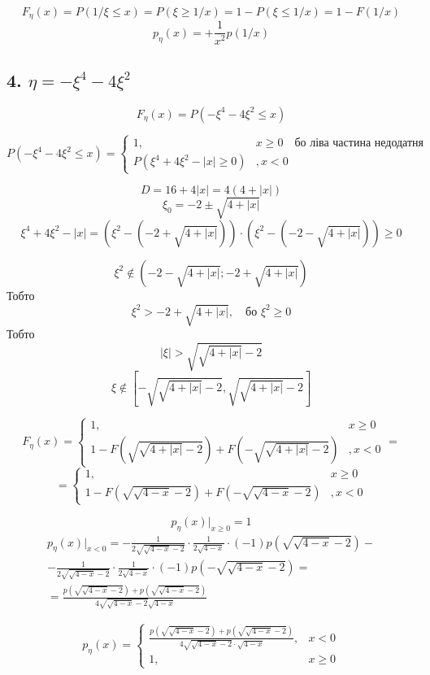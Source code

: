 \documentclass[11pt, a4paper]{article} %
\begin{document}
$$F_\eta(x) = P(1/\xi \le x) = P(\xi \ge 1/x) = 1 - P(\xi \le 1/x) = 1-F(1/x)$$
$$p_\eta(x) = +\frac{1}{x^2} p(1/x)$$

\subsection*{4. $\eta =-\xi^4-4\xi^2$}

$$F_\eta(x) = P(-\xi^4-4\xi^2 \le x)$$

$$P(-\xi^4 - 4\xi^2 \le x) = \begin{cases}
    1,& x\ge0 \quad \text{бо ліва частина недодатня}\\
    P(\xi^4 + 4\xi^2 - |x| \ge 0)&, x<0
\end{cases}$$

$$D = 16 + 4|x| = 4(4+|x|)$$
$$\xi_0 = -2 \pm \sqrt{4+|x|}$$
$$\xi^4 + 4\xi^2 - |x| = (\xi^2 - (-2 + \sqrt{4+|x|}))\cdot (\xi^2 - (-2 - \sqrt{4+|x|})) \ge 0$$

$$\xi^2 \notin (-2 - \sqrt{4+|x|}; -2 + \sqrt{4+|x|})$$
Тобто 
$$\xi^2 > -2 + \sqrt{4+|x|}, \quad \text{бо } \xi^2 \ge 0$$
Тобто
$$|\xi| > \sqrt{\sqrt{4+|x|}-2}$$
$$\xi \notin [-\sqrt{\sqrt{4+|x|}-2},\sqrt{\sqrt{4+|x|}-2}]$$

$$F_\eta(x) = \begin{cases}
    1,& x\ge0\\
    1-F(\sqrt{\sqrt{4+|x|}-2}) + F(-\sqrt{\sqrt{4+|x|}-2})&, x<0
\end{cases} = $$
$$= \begin{cases}
    1,& x\ge0\\
    1-F(\sqrt{\sqrt{4-x}-2}) + F(-\sqrt{\sqrt{4-x}-2})&, x<0
\end{cases}$$

$$p_\eta(x) |_{x\ge0} = 1$$
\begin{multline*}
    p_\eta(x) |_{x<0} = -\frac{1}{2\sqrt{\sqrt{4-x}-2}}\cdot \frac{1}{2\sqrt{4-x}} \cdot (-1) p(\sqrt{\sqrt{4-x}-2}) - \\
    - \frac{1}{2\sqrt{\sqrt{4-x}-2}}\cdot \frac{1}{2\sqrt{4-x}} \cdot (-1) p(-\sqrt{\sqrt{4-x}-2}) = \\
= \frac{p(\sqrt{\sqrt{4-x}-2}) + p(\sqrt{\sqrt{4-x}-2})}{4\sqrt{\sqrt{4-x}-2}\sqrt{4-x}}
\end{multline*}

$$p_\eta(x) = \begin{cases}
    \displaystyle \frac{p(\sqrt{\sqrt{4-x}-2}) + p(\sqrt{\sqrt{4-x}-2})}{4\sqrt{\sqrt{4-x}-2}\cdot \sqrt{4-x}}, & x<0\\
    1,& x\ge 0
\end{cases}$$
\end{document}
